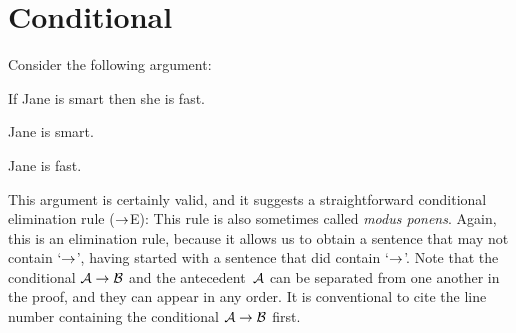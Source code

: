 \section{Conditional}
Consider the following argument:
\begin{earg}
		\item[] If Jane is smart then she is fast.
		\item[] Jane is smart.
		\item[\texttherefore] Jane is fast.
\end{earg}
This argument is certainly valid, and it suggests a straightforward conditional elimination rule ($\rightarrow$E):
This rule is also sometimes called \emph{modus ponens}. Again, this is
an elimination rule, because it allows us to obtain a sentence that
may not contain `$\rightarrow$', having started with a sentence that did
contain `$\rightarrow$'. Note that the conditional $\mathcal{A}\rightarrow\mathcal{B}$
and the antecedent~$\mathcal{A}$ can be separated from one another in
the proof, and they can appear in any order. It is conventional to
cite the line number containing the conditional
$\mathcal{A}\rightarrow\mathcal{B}$ first.

